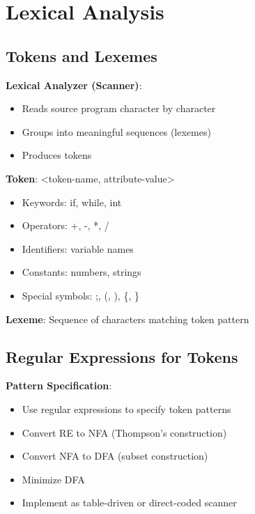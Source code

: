 \documentclass[12pt,a4paper]{report}
\begin{document}
\section{Lexical Analysis}

\subsection{Tokens and Lexemes}
\begin{concept}
\textbf{Lexical Analyzer (Scanner)}:
\begin{itemize}
    \item Reads source program character by character
    \item Groups into meaningful sequences (lexemes)
    \item Produces tokens
\end{itemize}

\textbf{Token}: <token-name, attribute-value>
\begin{itemize}
    \item Keywords: if, while, int
    \item Operators: +, -, *, /
    \item Identifiers: variable names
    \item Constants: numbers, strings
    \item Special symbols: ;, (, ), \{, \}
\end{itemize}

\textbf{Lexeme}: Sequence of characters matching token pattern
\end{concept}

\subsection{Regular Expressions for Tokens}
\begin{concept}
\textbf{Pattern Specification}:
\begin{itemize}
    \item Use regular expressions to specify token patterns
    \item Convert RE to NFA (Thompson's construction)
    \item Convert NFA to DFA (subset construction)
    \item Minimize DFA
    \item Implement as table-driven or direct-coded scanner
\end{itemize}
\end{concept}
\end{document}
